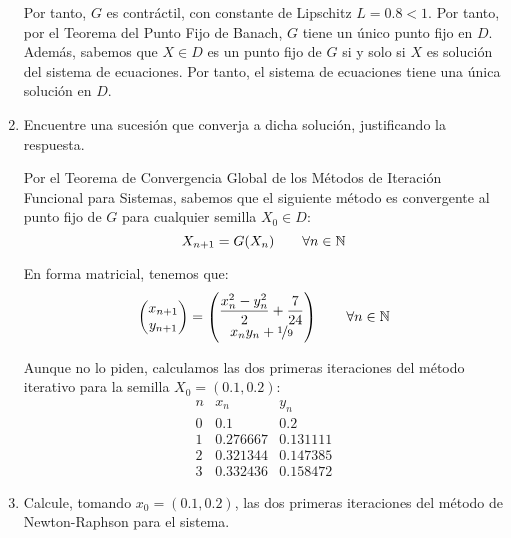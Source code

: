 \begin{ejercicio}
\begin{enumerate}
        Por tanto, $G$ es contráctil, con constante de Lipschitz $L=0.8<1$. Por tanto, por el Teorema del Punto Fijo de Banach, $G$ tiene un único punto fijo en $D$. Además, sabemos que $X\in D$ es un punto fijo de $G$ si y solo si $X$ es solución del sistema de ecuaciones. Por tanto, el sistema de ecuaciones tiene una única solución en $D$.


        \item Encuentre una sucesión que converja a dicha solución, justificando la respuesta.
        
        Por el Teorema de Convergencia Global de los Métodos de Iteración Funcional para Sistemas, sabemos que el siguiente método es convergente al punto fijo de $G$ para cualquier semilla $X_0\in D$:
        \begin{equation*}
            X_{n+1}=G(X_n)\qquad \forall n\in \mathbb{N}
        \end{equation*}

        En forma matricial, tenemos que:
        \begin{equation*}
            \begin{pmatrix}
                x_{n+1}\\
                y_{n+1}
            \end{pmatrix}=\begin{pmatrix}
                \dfrac{x_n^2-y_n^2}{2}+\dfrac{7}{24}\\
                x_ny_n+\nicefrac{1}{9}
            \end{pmatrix}\qquad \forall n\in \mathbb{N}
        \end{equation*}

        Aunque no lo piden, calculamos las dos primeras iteraciones del método iterativo para la semilla $X_0=(0.1,0.2)$:
        \begin{equation*}
            \begin{array}{c|c|c}
                n & x_n & y_n\\ \hline
                0 & 0.1 & 0.2\\
                1 & 0.276667 & 0.131111\\
                2 & 0.321344 & 0.147385\\
                3 & 0.332436 & 0.158472
            \end{array}
        \end{equation*}
        \item Calcule, tomando $x_0 = (0.1, 0.2)$, las dos primeras iteraciones del método de Newton-Raphson para el sistema.
        

\end{enumerate}
\end{ejercicio}
